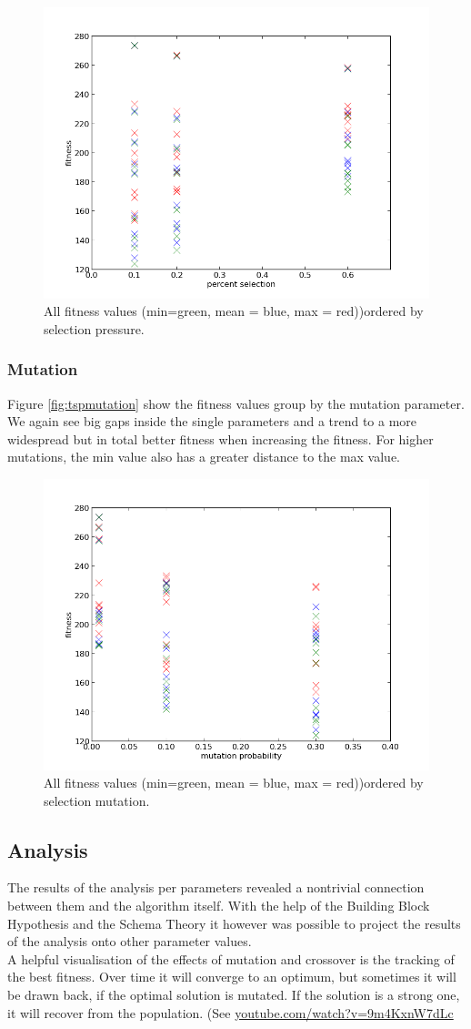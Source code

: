 \documentclass{scrartcl}
\begin{document}
\begin{figure}
 \center
 \includegraphics[width=.5\linewidth]{img/ex3/tsp_fitness_selection.png}
 \caption{All fitness values (min=green, mean = blue, max = red))ordered by selection pressure.}
 \label{fig:tspselect}
\end{figure}


\subsubsection{Mutation}
Figure \ref{fig:tspmutation} show the fitness values group by the mutation parameter. We again see big gaps inside the single parameters and a trend to a more widespread but in total better fitness when increasing the fitness. For higher mutations, the min value also has a greater distance to the max value.

\begin{figure}
 \center
 \includegraphics[width=.5\linewidth]{img/ex3/tsp_fitness_mutation.png}
 \caption{All fitness values (min=green, mean = blue, max = red))ordered by selection mutation.}
 \label{fig:tspmutate}
\end{figure}

\subsection{Analysis}
The results of the analysis per parameters revealed a nontrivial connection between them and the algorithm itself. With the help of the Building Block Hypothesis and the Schema Theory it however was possible to project the results of the analysis onto other parameter values.\\
A helpful visualisation of the effects of mutation and crossover is the tracking of the best fitness. Over time it will converge to an optimum, but sometimes it will be drawn back, if the optimal solution is mutated. If the solution is a strong one, it will recover from the population. (See \href{https://www.youtube.com/watch?v=9m4KxnW7dLc}{youtube.com/watch?v=9m4KxnW7dLc}
\end{document}

